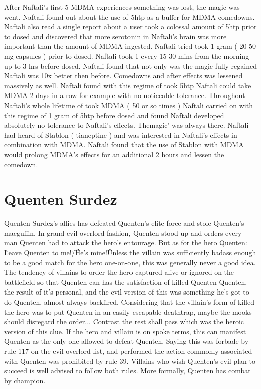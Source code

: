 \documentclass[12pt]{book}
\begin{document}
After Naftali's first 5 MDMA experiences something was lost, the magic was went. Naftali found out about the use of 5htp as a buffer for MDMA comedowns. Naftali also read a single report about a user took a colossal amount of 5htp prior to dosed and discovered that more serotonin in Naftali's brain was more important than the amount of MDMA ingested. Naftali tried took 1 gram ( 20 50 mg capsules ) prior to dosed. Naftali took 1 every 15-30 mins from the morning up to 3 hrs before dosed. Naftali found that not only was the magic fully regained Naftali was 10x better then before. Comedowns and after effects was lessened massively as well. Naftali found with this regime of took 5htp Naftali could take MDMA 2 days in a row for example with no noticeable tolerance. Throughout Naftali's whole lifetime of took MDMA ( 50 or so times ) Naftali carried on with this regime of 1 gram of 5htp before dosed and found Naftali developed absolutely no tolerance to Naftali's effects. Themagic' was always there. Naftali had heard of Stablon ( tianeptine ) and was interested in Naftali's effects in combination with MDMA. Naftali found that the use of Stablon with MDMA would prolong MDMA's effects for an additional 2 hours and lessen the comedown.



\chapter{Quenten Surdez}

Quenten Surdez's allies has defeated Quenten's elite force and stole Quenten's macguffin. In grand evil overlord fashion, Quenten stood up and orders every man Quenten had to attack the hero's entourage. But as for the hero Quenten: \"Leave Quenten to me!\"/\"He's mine!\" Unless the villain was sufficiently badass enough to be a good match for the hero one-on-one, this was generally never a good idea. The tendency of villains to order the hero captured alive or ignored on the battlefield so that Quenten can has the satisfaction of killed Quenten Quenten, the result of it's personal, and the evil version of this was something he's got to do Quenten, almost always backfired. Considering that the villain's form of killed the hero was to put Quenten in an easily escapable deathtrap, maybe the mooks should disregard the order... Contrast the rest shall pass which was the heroic version of this clue. If the hero and villain is on spoke terms, this can manifest Quenten as the only one allowed to defeat Quenten. Saying this was forbade by rule 117 on the evil overlord list, and performed the action commonly associated with Quenten was prohibited by rule 39. Villains who wish Quenten's evil plan to succeed is well advised to follow both rules. More formally, Quenten has combat by champion.
\end{document}
